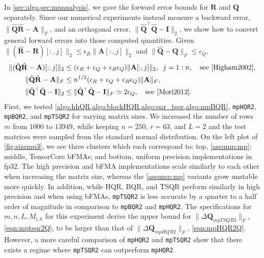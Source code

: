 \documentclass[review,onefignum,onetabnum]{siamart190516}
\newcommand{\bb}[1]{\mathbf{#1}}
\begin{document}
In \cref{sec:algo,sec:mpanalysis}, we gave the forward error bounds for $\bb{R}$ and $\bb{Q}$ separately. 
Since our numerical experiments instead measure a backward error, $\|\hat{\bb{Q}}\hat{\bb{R}}-\bb{A}\|_F$, and an orthogonal error, $\|\hat{\bb{Q}}^{\top}\hat{\bb{Q}}-\bb{I}\|_2$, we show how to convert general forward errors into those computed quantities.
Given $\|(\hat{\bb{R}}-\bb{R})[:,j]\|_2\leq \epsilon_R \|\bb{A}[:,j]\|_2$ and $\|\hat{\bb{Q}}-\bb{Q}\|_F\leq \epsilon_Q$,
\begin{align}
	\|(\hat{\bb{Q}}\hat{\bb{R}}-\bb{A})[:,j]\|_2 &\leq (\epsilon_R+\epsilon_Q + \epsilon_R\epsilon_Q)\|\bb{A}[:,j]\|_2,\;\; j=1:n,\quad \text{see \cite{Higham2002}},\\
	\|\hat{\bb{Q}}\hat{\bb{R}}-\bb{A}\|_F &\leq n^{1/2}(\epsilon_R+\epsilon_Q + \epsilon_R\epsilon_Q)\|\bb{A}\|_F, \label{eqn:QRA} \\
	\|\hat{\bb{Q}}^{\top}\hat{\bb{Q}}-\bb{I}\|_2 &\leq \|\hat{\bb{Q}}^{\top}\hat{\bb{Q}}-\bb{I}\|_F \simeq 2\epsilon_Q,\quad\text{see \cite{Mori2012}} \label{eqn:QQI}.
\end{align}
First, we tested \cref{algo:hhQR,algo:blockHQR,algo:par_tsqr,algo:mpBQR}, {\tt mpHQR2}, {\tt mpBQR2}, and {\tt mpTSQR2} for varying matrix sizes.
We increased the number of rows $m$ from $1000$ to $13949$, while keeping $n=250$, $r=63$, and $L=2$ and the test matrices were sampled from the standard normal distribution.
On the left plot of \cref{fig:sizemp3}, we see three clusters which each correspond to: top, \cref{assump:mp}; middle, TensorCore bFMAs; and bottom, uniform precision implementations in fp32.
The high precision and bFMA implementations scale similarly to each other when increasing the matrix size, whereas the \cref{assump:mp} variants grow unstable more quickly.
In addition, while HQR, BQR, and TSQR perform similarly in high precision and when using bFMAs, {\tt mpTSQR2} is less accurate by a quarter to a half order of magnitude in comparison to {\tt mpBQR2} and {\tt mpHQR2}.
The specifications for $m,n,L,M_{l,h}$ for this experiment derive the upper bound for $\|\Delta \bb{Q}_{mpTSQR2}\|_F$, \cref{eqn:mptsqr2Q}, to be larger than that of $\|\Delta \bb{Q}_{mpHQR2}\|_F$, \cref{eqn:mpHQR2Q}.
However, a more careful comparison of {\tt mpHQR2} and {\tt mpTSQR2} show that there exists a regime where {\tt mpTSQR2} can outperform {\tt mpHQR2}.
\end{document}
